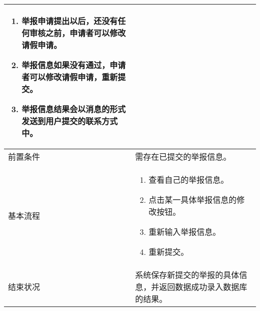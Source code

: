 \begin{table}[htbp]
\begin{tabular}{|l|l|l|l|}
{\begin{minipage}[t]{0.8\textwidth}
                \begin{enumerate}[nosep]
                    \item 举报申请提出以后，还没有任何审核之前，申请者可以修改请假申请。
                    \item 举报信息如果没有通过，申请者可以修改请假申请，重新提交。
                    \item 举报信息结果会以消息的形式发送到用户提交的联系方式中。
                          \vspace{0.5em}
                \end{enumerate}
            \end{minipage}     }                                                                                                                                                                                                                  \\
        \hline
        前置条件                          & \multicolumn{3}{l|}{  需存在已提交的举报信息。  }                                                                                                                                                             \\
        \hline
        基本流程                          & \multicolumn{3}{l|}{
        \begin{minipage}[t]{0.8\textwidth}
                \begin{enumerate}[nosep]
                    \item 查看自己的举报信息。
                    \item 点击某一具体举报信息的修改按钮。
                    \item 重新输入举报信息。
                    \item 重新提交。
                          \vspace{0.5em}
                \end{enumerate}
            \end{minipage}     }                                                                                                                                                                                                                  \\
        \hline
        结束状况                          & \multicolumn{3}{l|}{系统保存新提交的举报的具体信息，并返回数据成功录入数据库的结果。    }                                                                                                                     \\

\end{tabular}
\end{table}

